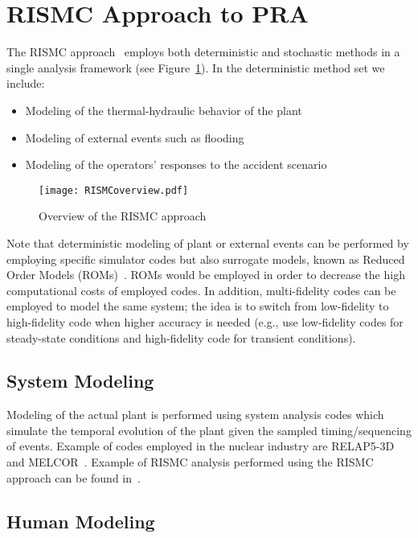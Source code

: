 \section{RISMC Approach to PRA}
\label{sec:rismc}
The RISMC approach~\cite{RISMC} employs both deterministic and stochastic methods 
in a single analysis framework (see Figure~\ref{fig:RISMCoverview}). In the deterministic method 
set we include:
\begin{itemize}
  \item Modeling of the thermal-hydraulic behavior of the plant~\cite{BWR_SBO_Mandelli,BWRanalysis}
  \item Modeling of external events such as flooding~\cite{mandelliPSA2015}
  \item Modeling of the operators’ responses to the accident scenario~\cite{HRA_BoringReport2014}
\end{itemize}

\begin{figure}
    \centering
    \centerline{\texttt{[image: RISMCoverview.pdf]}}
    \caption{Overview of the RISMC approach}
    \label{fig:RISMCoverview}
\end{figure}

Note that deterministic modeling of plant or external events can be performed by employing 
specific simulator codes but also surrogate models, known as Reduced Order Models 
(ROMs)~\cite{ROM_Khalik}. 
ROMs would be employed in order to decrease the high computational costs of employed codes.
In addition, multi-fidelity codes can be employed to model the same system; the idea is to 
switch from low-fidelity to high-fidelity code when higher accuracy is needed (e.g., use 
low-fidelity codes for steady-state conditions and high-fidelity code for transient conditions).

\subsection{System Modeling}

Modeling of the actual plant is performed using system analysis codes which simulate the temporal 
evolution of the plant given the sampled timing/sequencing of events. Example of codes employed 
in the nuclear industry are RELAP5-3D~\cite{relap5} and MELCOR~\cite{Melcor}. 
Example of RISMC analysis performed using the RISMC approach can be 
found in~\cite{BWR_SBO_Mandelli,BWRanalysis,PRA_comparison_PSA2015}.

\subsection{Human Modeling}

